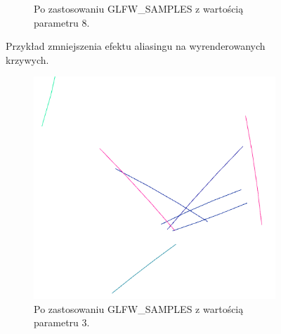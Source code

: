 \begin{figure}[H]
\begin{subfigure}{0.45\textwidth}
    	\caption{Po zastosowaniu GLFW\_SAMPLES z wartością parametru 8.}
		\label{rys12}
	\end{subfigure}
    \caption{Przykład zmniejszenia efektu aliasingu na wyrenderowanych krzywych.}
    \label{rys13}
\end{figure}

\begin{figure}[H]
	\begin{subfigure}{0.5\textwidth}
		\centering
 		\includegraphics[width=\textwidth]{Wart3.png}
    	\caption{Po zastosowaniu GLFW\_SAMPLES z wartością parametru 3.}
 		\label{rys15}
	\end{subfigure}
	\hfill
	\begin{subfigure}{0.5\textwidth}
		\centering

\end{subfigure}
\end{figure}
